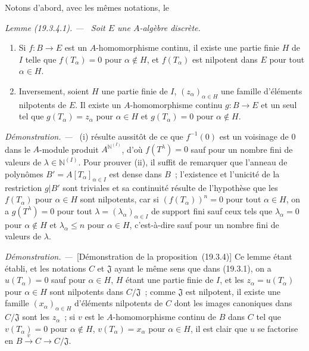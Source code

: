 \documentclass[10pt,oneside]{book}
\makeatletter
\newcommand{\setmanualcurrentlabel}[1]{\def\@currentlabel{#1}}
\newcommand{\oldpage}[2][]{%
  \setcounter{footnote}{0}%
  \marginpar{\scriptsize\textbf{#1}~|~#2}\ignorespaces}
\newenvironment{lemma}[1][]{%
  \setmanualcurrentlabel{#1}\par\medskip\noindent\itshape Lemme (#1). ---\ }{\par}
\newenvironment{proof}{%
  \par\medskip\noindent\textit{Démonstration. ---\ }}{\par}
\makeatother
\begin{document}
Notons d'abord, avec les mêmes notations, le
\begin{lemma}[19.3.4.1]
\label{0.19.3.4.1-fr}
Soit $E$ une $A$-algèbre discrète.
\begin{enumerate}
  \item[(i)] Si $f:B\to E$ est un $A$-homomorphisme continu, il existe une
  partie finie $H$ de $I$ telle que $f(T_\alpha)=0$ pour $\alpha\notin H$,
  et $f(T_\alpha)$ est nilpotent dans $E$ pour tout $\alpha\in H$.
  \item[(ii)] Inversement, soient $H$ une partie finie de $I$,
  $(z_\alpha)_{\alpha\in H}$ une famille d'éléments nilpotents de $E$.
  Il existe un $A$-homomorphisme continu $g:B\to E$ et un seul tel que
  $g(T_\alpha)=z_\alpha$ pour $\alpha\in H$ et
  $g(T_\alpha)=0$ pour $\alpha\notin H$.
\end{enumerate}
\end{lemma}

\oldpage[0\textsubscript{IV-1}]{81}

\begin{proof}
(i) résulte aussitôt de ce que $f^{-1}(0)$ est un voisinage de $0$ dans le
$A$-module produit $A^{\mathbb{N}^{(I)}}$, d'où $f(T^\lambda)=0$ sauf pour un
nombre fini de valeurs de $\lambda\in\mathbb{N}^{(I)}$. Pour prouver (ii), il
suffit de remarquer que l'anneau de polynômes
$B'=A[T_\alpha]_{\alpha\in I}$ est dense dans $B$~; l'existence et
l'unicité de la restriction $g|B'$ sont triviales et sa continuité résulte de
l'hypothèse que les $f(T_\alpha)$ pour $\alpha\in H$ sont nilpotents,
car si $(f(T_\alpha))^n=0$ pour tout $\alpha\in H$, on a
$g(T^\lambda)=0$ pour tout $\lambda=(\lambda_\alpha)_{\alpha\in I}$ de
support fini sauf ceux tels que $\lambda_\alpha=0$ pour
$\alpha\notin H$ et $\lambda_\alpha\leq n$ pour
$\alpha\in H$, c'est-à-dire sauf pour un nombre fini de valeurs de
$\lambda$.
\end{proof}

\begin{proof}[Démonstration de la proposition~{\rm(19.3.4)}]
Ce lemme étant établi, et les notations $C$ et $\mathfrak J$ ayant le même
sens que dans (19.3.1), on a $u(T_\alpha)=0$ sauf pour
$\alpha\in H$, $H$ étant une partie finie de $I$, et les
$z_\alpha=u(T_\alpha)$ pour $\alpha\in H$ sont nilpotents dans
$C/\mathfrak J$~; comme $\mathfrak J$ est nilpotent, il existe une famille
$(x_\alpha)_{\alpha\in H}$ d'éléments nilpotents de $C$ dont les images
canoniques dans $C/\mathfrak J$ sont les $z_\alpha$~; si $v$ est le
$A$-homomorphisme continu de $B$ dans $C$ tel que
$v(T_\alpha)=0$ pour $\alpha\notin H$, $v(T_\alpha)=x_\alpha$ pour
$\alpha\in H$, il est clair que $u$ se factorise en
$B\xrightarrow{v}C\to C/\mathfrak J$.
\end{proof}
\end{document}
